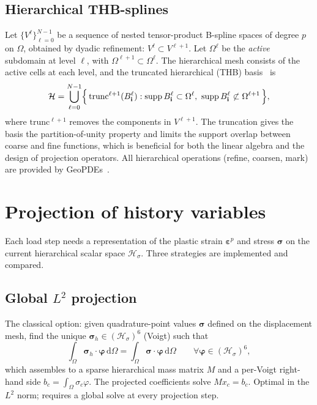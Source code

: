 \documentclass[11pt,a4paper]{article}
\newcommand{\bsigma}{\boldsymbol{\sigma}}
\newcommand{\beps}{\boldsymbol{\varepsilon}}
\newcommand{\Hspace}{\mathcal{H}}
\begin{document}
\subsection{Hierarchical THB-splines}

Let $\{V^\ell\}_{\ell=0}^{N-1}$ be a sequence of nested
tensor-product B-spline spaces of degree $p$ on $\Omega$, obtained by
dyadic refinement: $V^\ell \subset V^{\ell+1}$.  Let $\Omega^\ell$ be the
\emph{active} subdomain at level $\ell$, with $\Omega^{\ell+1}\subset
\Omega^\ell$.  The hierarchical mesh consists of the active cells at each
level, and the truncated hierarchical (THB) basis~\cite{Giannelli2012} is
\begin{equation}
    \Hspace =
    \bigcup_{\ell=0}^{N-1}
    \Bigl\{\,\mathrm{trunc}^{\ell+1}(B_{\mathbf{i}}^\ell) :
            \mathrm{supp}\, B_{\mathbf{i}}^\ell \subset \Omega^\ell,\
            \mathrm{supp}\, B_{\mathbf{i}}^\ell \not\subset \Omega^{\ell+1}\,\Bigr\},
\end{equation}
where $\mathrm{trunc}^{\ell+1}$ removes the components in $V^{\ell+1}$.
The truncation gives the basis the partition-of-unity property and
limits the support overlap between coarse and fine functions, which is
beneficial for both the linear algebra and the design of projection
operators.  All hierarchical operations (refine, coarsen, mark) are
provided by GeoPDEs~\cite{Vazquez2016}.

\section{Projection of history variables}\label{sec:projection}

Each load step needs a representation of the plastic strain $\beps^p$
and stress $\bsigma$ on the current hierarchical scalar space
$\Hspace_\sigma$.  Three strategies are implemented and compared.

\subsection{Global $L^2$ projection}

The classical option: given quadrature-point values $\bsigma$ defined on
the displacement mesh, find the unique
$\bsigma_h \in (\Hspace_\sigma)^6$ (Voigt) such that
\begin{equation}
    \int_\Omega \bsigma_h \cdot \boldsymbol{\varphi}\,\mathrm{d}\Omega
    = \int_\Omega \bsigma \cdot \boldsymbol{\varphi}\,\mathrm{d}\Omega
    \qquad \forall \boldsymbol{\varphi} \in (\Hspace_\sigma)^6,
\end{equation}
which assembles to a sparse hierarchical mass matrix $M$ and a per-Voigt
right-hand side $b_c = \int_\Omega \sigma_c \varphi$.  The projected
coefficients solve $M x_c = b_c$.  Optimal in the $L^2$ norm; requires
a global solve at every projection step.
\end{document}
